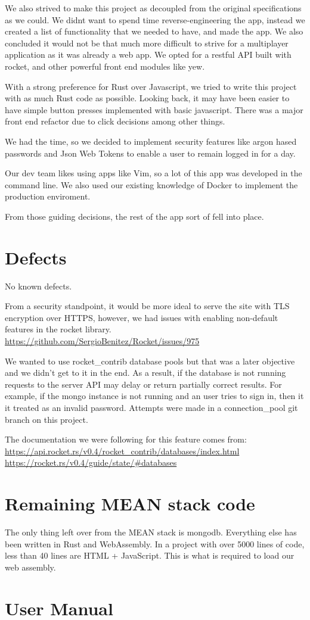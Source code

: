 \documentclass[letterpaper]{article}
\begin{document}
We also strived to make this project as decoupled from the original specifications as we could. We didnt want to spend time reverse-engineering the app, instead we created a list of functionality that we needed to have, and made the app. We also concluded it would not be that much more difficult to strive for a multiplayer application as it was already a web app. We opted for a restful API built with rocket, and other powerful front end modules like yew.

With a strong preference for Rust over Javascript, we tried to write this project with as much Rust code as possible. Looking back, it may have been easier to have simple button presses implemented with basic javascript. There was a major front end refactor due to click decisions among other things.

We had the time, so we decided to implement security features like argon hased passwords and Json Web Tokens to enable a user to remain logged in for a day.


Our dev team likes using apps like Vim, so a lot of this app was developed in the command line. We also used our existing knowledge of Docker to implement the production enviroment.


From those guiding decisions, the rest of the app sort of fell into place.

\section{Defects}
No known defects.

From a security standpoint, it would be more ideal to serve the site with TLS encryption over HTTPS,
however, we had issues with enabling non-default features in the rocket library.
\url{https://github.com/SergioBenitez/Rocket/issues/975}

We wanted to use rocket\_contrib database pools but that was a later objective and we didn't get to it in the end. As a result, if the database is not running requests to the server API may delay or return partially correct results. For example, if the mongo instance is not running and an user tries to sign in, then it it treated as an invalid password. Attempts were made in a connection\_pool git branch on this project.

The documentation we were following for this feature comes from:
\url{https://api.rocket.rs/v0.4/rocket\_contrib/databases/index.html}
\url{https://rocket.rs/v0.4/guide/state/#databases}

\section{Remaining MEAN stack code}
The only thing left over from the MEAN stack is mongodb. Everything
else has been written in Rust and WebAssembly. In a project with over
5000 lines of code, less than 40 lines are HTML + JavaScript. This is
what is required to load our web assembly.


\section{User Manual}
\end{document}
